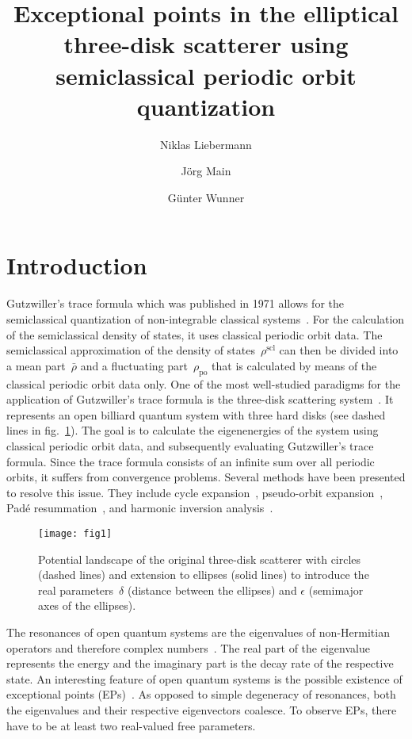 \documentclass[doublecol]{epl2}
\title{Exceptional points in the elliptical three-disk scatterer using semiclassical periodic orbit quantization}
\author{Niklas Liebermann \and Jörg Main \and Günter Wunner}
\institute{
  1. Institut für Theoretische Physik, Universität Stuttgart - 70550 Stuttgart, Germany
}
\begin{document}
\maketitle

\section{Introduction}
Gutzwiller's trace formula which was published in 1971 allows for the semiclassical quantization of non-integrable classical systems~\cite{gutzwiller_phaseintegral_1967,gutzwiller_periodic_1971,gutzwiller_chaos_2013}. For the calculation of the semiclassical density of states, it uses classical periodic orbit data. The semiclassical approximation of the density of states~$\rho^\mathrm{scl}$ can then be divided into a mean part~$\bar{\rho}$ and a fluctuating part~$\rho_\mathrm{po}$ that is calculated by means of the classical periodic orbit data only. One of the most well-studied paradigms for the application of Gutzwiller's trace formula is the three-disk scattering system~\cite{eckhardt_fractal_1987,gaspard_scattering_1989}. It represents an open billiard quantum system with three hard disks (see dashed lines in fig.~\ref{fig:sketch}). The goal is to calculate the eigenenergies of the system using classical periodic orbit data, and subsequently evaluating Gutzwiller's trace formula. Since the trace formula consists of an infinite sum over all periodic orbits, it suffers from convergence problems. Several methods have been presented to resolve this issue. They include cycle expansion~\cite{cvitanovic_periodic-orbit_1989}, pseudo-orbit expansion~\cite{berry_rule_1990}, Padé resummation~\cite{main_semiclassical_1999}, and harmonic inversion analysis~\cite{main_use_1999}.

\begin{figure}[t]
  \centering
  \texttt{[image: fig1]}
  \caption{Potential landscape of the original three-disk scatterer with circles (dashed lines) and extension to ellipses (solid lines) to introduce the real parameters~$\delta$ (distance between the ellipses) and $\epsilon$ (semimajor axes of the ellipses).}
  \label{fig:sketch}
\end{figure}

The resonances of open quantum systems are the eigenvalues of non-Hermitian operators and therefore complex numbers~\cite{moiseyev_non-hermitian_2011}. The real part of the eigenvalue represents the energy and the imaginary part is the decay rate of the respective state. An interesting feature of open quantum systems is the possible existence of exceptional points (EPs)~\cite{moiseyev_non-hermitian_2011,kato_perturbation_2013,heiss_phases_1999,heiss_physics_2012}. As opposed to simple degeneracy of resonances, both the eigenvalues and their respective eigenvectors coalesce. To observe EPs, there have to be at least two real-valued free parameters.
\end{document}
